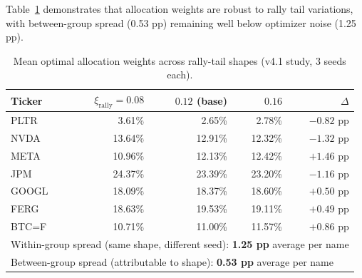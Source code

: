 \documentclass[11pt]{article}
\begin{document}
\noindent Table~\ref{tab:rallysens} demonstrates that allocation weights are robust to rally tail variations,
with between-group spread (0.53 pp) remaining well below optimizer noise (1.25 pp).

\begin{table}[H]
\centering
\caption{Mean optimal allocation weights across rally-tail shapes (v4.1 study, 3 seeds each).}
\label{tab:rallysens}
\small
\begin{tabular}{lrrrr}
\toprule
Ticker & $\xi_{\text{rally}}=0.08$ & $0.12$ (base) & $0.16$ & $\Delta$ \\
\midrule
PLTR   &  3.61\% &  2.65\% &  2.78\% & $-0.82$ pp \\
NVDA   & 13.64\% & 12.91\% & 12.32\% & $-1.32$ pp \\
META   & 10.96\% & 12.13\% & 12.42\% & $+1.46$ pp \\
JPM    & 24.37\% & 23.39\% & 23.20\% & $-1.16$ pp \\
GOOGL  & 18.09\% & 18.37\% & 18.60\% & $+0.50$ pp \\
FERG   & 18.63\% & 19.53\% & 19.11\% & $+0.49$ pp \\
BTC=F  & 10.71\% & 11.00\% & 11.57\% & $+0.86$ pp \\
\midrule
\multicolumn{5}{l}{Within-group spread (same shape, different seed): \textbf{1.25 pp} average per name} \\
\multicolumn{5}{l}{Between-group spread (attributable to shape): \textbf{0.53 pp} average per name} \\
\bottomrule
\end{tabular}
\end{table}
\end{document}
